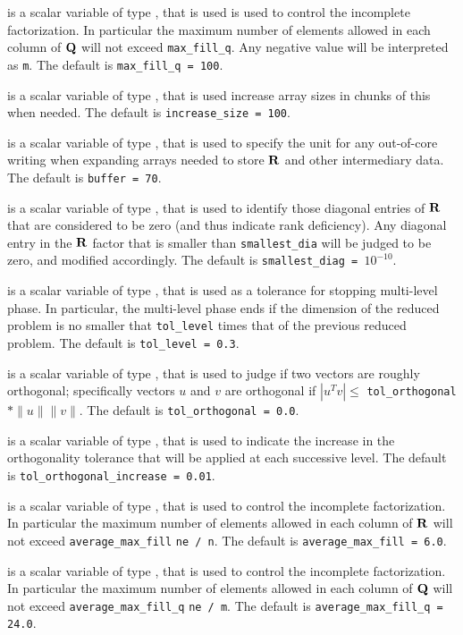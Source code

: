\documentclass{galahad}
\begin{document}
\begin{description}
 is a scalar variable of type \integer, that is used
is used to control the incomplete factorization. In particular
the maximum number of elements allowed in each column of ${\mathbf{Q}}$ will not exceed
{\tt max\_fill\_q}.
Any negative value will be interpreted as {\tt m}.
The default is {\tt max\_fill\_q = 100}.

  is a scalar variable of type \integer, that is 
used increase array sizes in chunks of this when needed.
The default is {\tt increase\_size = 100}.

 is a scalar variable of type \integer, that is used
to specify the unit for any out-of-core writing when expanding arrays
needed to store ${\mathbf{R}}$ and other intermediary data. 
The default is {\tt buffer = 70}.

 is a scalar variable of type \realdp, that is used
to identify those diagonal entries of ${\mathbf{R}}$ that are considered to be zero
(and thus indicate rank deficiency). Any diagonal entry in the ${\mathbf{R}}$
factor that is smaller than {\tt smallest\_dia} will be judged to be zero, 
and modified accordingly.
The default is {\tt smallest\_diag = }$10^{-10}$.

 is a scalar variable of type \realdp, that is used
as a tolerance for stopping multi-level phase. In particular, the
multi-level phase ends if the dimension of the reduced problem 
is no smaller that {\tt tol\_level} times that of the previous
reduced problem.
The default is {\tt tol\_level = 0.3}.

 is a scalar variable of type \realdp, 
that is used to judge if two vectors are roughly orthogonal; specifically
vectors $u$ and $v$ are orthogonal if $|u^T v| \leq$ {\tt tol\_orthogonal} 
$\ast \|u\| \|v\|$.
The default is {\tt tol\_orthogonal = 0.0}.

 is a scalar variable of type \realdp, 
that is used to indicate the increase in the orthogonality tolerance 
that will be applied at each successive level.
The default is {\tt tol\_orthogonal\_increase = 0.01}.

 is a scalar variable of type \realdp, that 
is used to control the incomplete factorization. In particular
 the maximum number of elements allowed in each column of ${\mathbf{R}}$ will not exceed
{\tt average\_max\_fill} {\tt * ne / n}.
The default is {\tt average\_max\_fill = 6.0}.

 is a scalar variable of type \realdp, that 
is used to control the incomplete factorization. In particular
 the maximum number of elements allowed in each column of ${\mathbf{Q}}$ will not exceed
{\tt average\_max\_fill\_q} {\tt * ne / m}.
The default is {\tt average\_max\_fill\_q = 24.0}.


\end{description}
\end{document}
